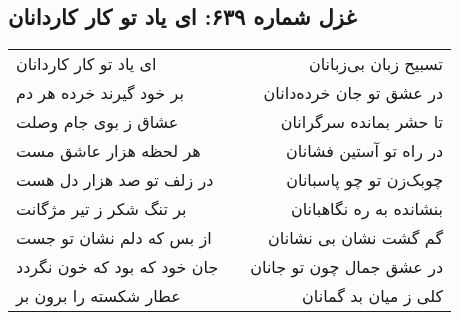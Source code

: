 \begin{center}
\section*{غزل شماره ۶۳۹: ای یاد تو کار کاردانان}
\label{sec:639}
\begin{longtable}{l p{0.5cm} r}
ای یاد تو کار کاردانان
&&
تسبیح زبان بی‌زبانان
\\
بر خود گیرند خرده هر دم
&&
در عشق تو جان خرده‌دانان
\\
عشاق ز بوی جام وصلت
&&
تا حشر بمانده سرگرانان
\\
هر لحظه هزار عاشق مست
&&
در راه تو آستین فشانان
\\
در زلف تو صد هزار دل هست
&&
چوبک‌زن تو چو پاسبانان
\\
بر تنگ شکر ز تیر مژگانت
&&
بنشانده به ره نگاهبانان
\\
از بس که دلم نشان تو جست
&&
گم گشت نشان بی نشانان
\\
جان خود که بود که خون نگردد
&&
در عشق جمال چون تو جانان
\\
عطار شکسته را برون بر
&&
کلی ز میان بد گمانان
\\
\end{longtable}
\end{center}
